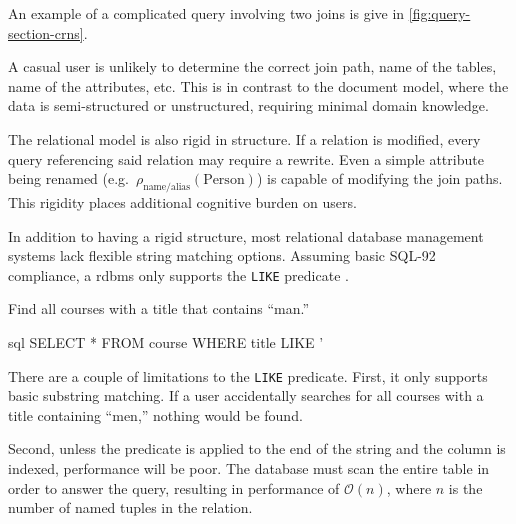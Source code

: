 			An example of a complicated query involving two joins is give in \vref{fig:query-section-crns}.
			
			A casual user is unlikely to determine the correct join path, name of the tables, name of the attributes, etc.	This is in contrast to the document model, where the data is semi-structured or unstructured, requiring minimal domain knowledge.

			The relational model is also rigid in structure.  If a relation is modified, every query referencing said relation may require a rewrite.  Even a simple attribute being renamed (e.g.~\(\rho_{\text{name/alias}}(\text{Person})\)) is capable of modifying the join paths.  This rigidity places additional cognitive burden on users.
			
			In addition to having a rigid structure, most relational database management systems lack flexible string matching options.	 Assuming basic SQL-92 compliance, a \gls{rdbms} only supports the \texttt{LIKE} predicate \cite{sql-11}.
			
			\begin{ex}
				Find all courses with a title that contains ``man.''
				
				\begin{singlespaced}
					\begin{pygments}{sql}
SELECT *
FROM   course
WHERE  title LIKE '%
					\end{pygments}
				\end{singlespaced}
			\end{ex}
			
			There are a couple of limitations to the \texttt{LIKE} predicate.  First, it only supports basic substring matching.  If a user accidentally searches for all courses with a title containing ``men,'' nothing would be found.
			
			Second, unless the predicate is applied to the end of the string and the column is indexed, performance will be poor.  The database must scan the entire table in order to answer the query, resulting in performance of \(\mathcal{O}(n)\), where \(n\) is the number of named tuples in the relation.